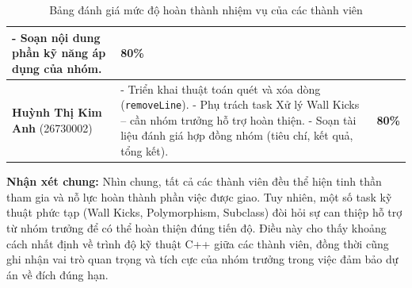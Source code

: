 \begin{table}[H]
\begin{tabular}{|p{3.8cm}|p{7.5cm}|c|}
        - Soạn nội dung phần kỹ năng áp dụng của nhóm. &
        \textbf{80\%} \\
        \hline
        \textbf{Huỳnh Thị Kim Anh} \newline (26730002) &
        - Triển khai thuật toán quét và xóa dòng (\texttt{removeLine}).\newline
        - Phụ trách task Xử lý Wall Kicks -- cần nhóm trưởng hỗ trợ hoàn thiện.\newline
        - Soạn tài liệu đánh giá hợp đồng nhóm (tiêu chí, kết quả, tổng kết). &
        \textbf{80\%} \\
        \hline
    \end{tabular}
    \caption{Bảng đánh giá mức độ hoàn thành nhiệm vụ của các thành viên}
\end{table}

\textbf{Nhận xét chung:}
Nhìn chung, tất cả các thành viên đều thể hiện tinh thần tham gia và nỗ lực hoàn thành phần việc được giao. Tuy nhiên, một số task kỹ thuật phức tạp (Wall Kicks, Polymorphism, Subclass) đòi hỏi sự can thiệp hỗ trợ từ nhóm trưởng để có thể hoàn thiện đúng tiến độ. Điều này cho thấy khoảng cách nhất định về trình độ kỹ thuật C++ giữa các thành viên, đồng thời cũng ghi nhận vai trò quan trọng và tích cực của nhóm trưởng trong việc đảm bảo dự án về đích đúng hạn.
